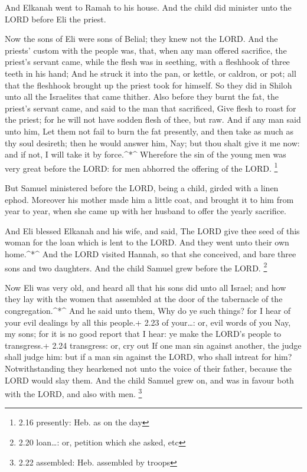  And Elkanah went to Ramah to his house. And the child did
minister unto the LORD before Eli the priest.

 Now the sons of Eli were sons of Belial; they knew not the
LORD.  And the priests' custom with the people was, that,
when any man offered sacrifice, the priest's servant came, while the
flesh was in seething, with a fleshhook of three teeth in his hand;
 And he struck it into the pan, or kettle, or caldron, or
pot; all that the fleshhook brought up the priest took for himself. So
they did in Shiloh unto all the Israelites that came thither.
 Also before they burnt the fat, the priest's servant came,
and said to the man that sacrificed, Give flesh to roast for the priest;
for he will not have sodden flesh of thee, but raw.  And if
any man said unto him, Let them not fail to burn the fat presently, and
then take as much as thy soul desireth; then he would answer him, Nay;
but thou shalt give it me now: and if not, I will take it by
force.\^{}*\^{}  Wherefore the sin of the young men was
very great before the LORD: for men abhorred the offering of the LORD.
\footnote{2.16 presently: Heb. as on the day}

 But Samuel ministered before the LORD, being a child,
girded with a linen ephod.  Moreover his mother made him a
little coat, and brought it to him from year to year, when she came up
with her husband to offer the yearly sacrifice.

 And Eli blessed Elkanah and his wife, and said, The LORD
give thee seed of this woman for the loan which is lent to the LORD. And
they went unto their own home.\^{}*\^{}  And the LORD
visited Hannah, so that she conceived, and bare three sons and two
daughters. And the child Samuel grew before the LORD. \footnote{2.20
  loan\ldots: or, petition which she asked, etc}

 Now Eli was very old, and heard all that his sons did unto
all Israel; and how they lay with the women that assembled at the door
of the tabernacle of the congregation.\^{}*\^{}  And he
said unto them, Why do ye such things? for I hear of your evil dealings
by all this people.+ 2.23 of your\ldots: or, evil words of you
 Nay, my sons; for it is no good report that I hear: ye
make the LORD's people to transgress.+ 2.24 transgress: or, cry out
 If one man sin against another, the judge shall judge him:
but if a man sin against the LORD, who shall intreat for him?
Notwithstanding they hearkened not unto the voice of their father,
because the LORD would slay them.  And the child Samuel
grew on, and was in favour both with the LORD, and also with men.
\footnote{2.22 assembled: Heb. assembled by troops}

